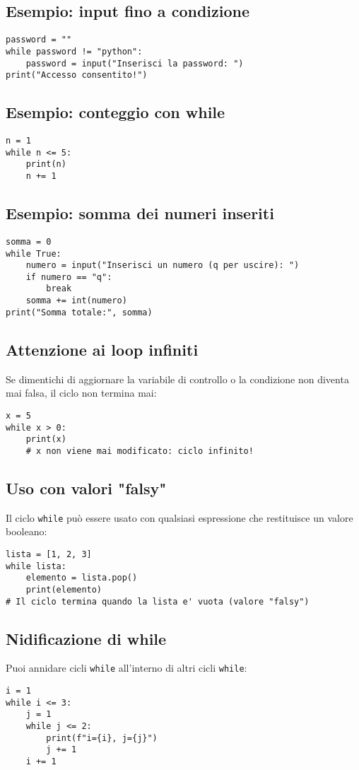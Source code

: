 \documentclass[a4paper,12pt]{article}
\begin{document}
\subsection*{Esempio: input fino a condizione}
\begin{lstlisting}
password = ""
while password != "python":
    password = input("Inserisci la password: ")
print("Accesso consentito!")
\end{lstlisting}

\subsection*{Esempio: conteggio con while}
\begin{lstlisting}
n = 1
while n <= 5:
    print(n)
    n += 1
\end{lstlisting}

\subsection*{Esempio: somma dei numeri inseriti}
\begin{lstlisting}
somma = 0
while True:
    numero = input("Inserisci un numero (q per uscire): ")
    if numero == "q":
        break
    somma += int(numero)
print("Somma totale:", somma)
\end{lstlisting}

\subsection*{Attenzione ai loop infiniti}
Se dimentichi di aggiornare la variabile di controllo o la condizione non diventa mai falsa, il ciclo non termina mai:
\begin{lstlisting}
x = 5
while x > 0:
    print(x)
    # x non viene mai modificato: ciclo infinito!
\end{lstlisting}

\subsection*{Uso con valori "falsy"}
Il ciclo \texttt{while} può essere usato con qualsiasi espressione che restituisce un valore booleano:
\begin{lstlisting}
lista = [1, 2, 3]
while lista:
    elemento = lista.pop()
    print(elemento)
# Il ciclo termina quando la lista e' vuota (valore "falsy")
\end{lstlisting}

\subsection*{Nidificazione di while}
Puoi annidare cicli \texttt{while} all'interno di altri cicli \texttt{while}:
\begin{lstlisting}
i = 1
while i <= 3:
    j = 1
    while j <= 2:
        print(f"i={i}, j={j}")
        j += 1
    i += 1
\end{lstlisting}
\end{document}
